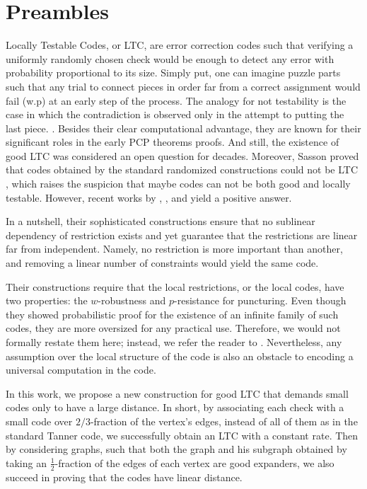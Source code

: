 \documentclass[manuscript,screen,review]{acmart}
\begin{document}
\section{Preambles}

Locally Testable Codes, or LTC, are error correction codes such that verifying a uniformly randomly chosen check would be enough to detect any error with probability proportional to its size. Simply put, one can imagine puzzle parts such that any trial to connect pieces in order far from a correct assignment would fail (w.p) at an early step of the process. The analogy for not testability is the case in which the contradiction is observed only in the attempt to putting the last piece.     
 \cite{aharonov1999}.
Besides their clear computational advantage, they are known for their significant roles in the early PCP theorems proofs. And still, the existence of good LTC was considered an open question for decades. Moreover, Sasson proved that codes obtained by the standard randomized constructions could not be LTC \cite{Sasson}, which raises the suspicion that maybe codes can not be both good and locally testable. However, recent works by \cite{Dinur}, \cite{Pavel}, and \cite{leverrier2022quantum} yield a positive answer.

In a nutshell, their sophisticated constructions ensure that no sublinear dependency of restriction exists and yet guarantee that the restrictions are linear far from independent. Namely, no restriction is more important than another, and removing a linear number of constraints would yield the same code.  

Their constructions require that the local restrictions, or the local codes, have two properties: the $w$-robustness and $p$-resistance for puncturing. Even though they showed probabilistic proof for the existence of an infinite family of such codes, they are more oversized for any practical use. Therefore, we would not formally restate them here; instead, we refer the reader to \cite{leverrier2022quantum}. Nevertheless, any assumption over the local structure of the code is also an obstacle to encoding a universal computation in the code. 

In this work, we propose a new construction for good LTC that demands small codes only to have a large distance. In short, by associating each check with a small code over $2/3$-fraction of the vertex's edges, instead of all of them as in the standard Tanner code, we successfully obtain an LTC with a constant rate. Then by considering graphs, such that both the graph and his subgraph obtained by taking an $\frac{1}{2}$-fraction of the edges of each vertex are good expanders, we also succeed in proving that the codes have linear distance. 
\end{document}

